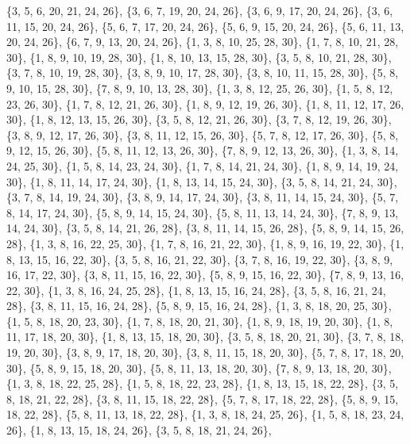 \documentclass[11pt,a4paper]{article}
\begin{document}
{\{3, 5, 6, 20, 21, 24, 26\}, \{3, 6, 7, 19, 20, 24, 26\}, \{3, 6, 9, 17, 20, 24, 26\}, \{3, 6, 11, 15, 20, 24, 26\}, \{5, 6, 7, 17, 20, 24, 26\},
\{5, 6, 9, 15, 20, 24, 26\}, \{5, 6, 11, 13, 20, 24, 26\}, \{6, 7, 9, 13, 20, 24, 26\}, \{1, 3, 8, 10, 25, 28, 30\}, \{1, 7, 8, 10, 21, 28, 30\},
\{1, 8, 9, 10, 19, 28, 30\}, \{1, 8, 10, 13, 15, 28, 30\}, \{3, 5, 8, 10, 21, 28, 30\}, \{3, 7, 8, 10, 19, 28, 30\}, \{3, 8, 9, 10, 17, 28, 30\},
\{3, 8, 10, 11, 15, 28, 30\}, \{5, 8, 9, 10, 15, 28, 30\}, \{7, 8, 9, 10, 13, 28, 30\}, \{1, 3, 8, 12, 25, 26, 30\}, \{1, 5, 8, 12, 23, 26, 30\},
\{1, 7, 8, 12, 21, 26, 30\}, \{1, 8, 9, 12, 19, 26, 30\}, \{1, 8, 11, 12, 17, 26, 30\}, \{1, 8, 12, 13, 15, 26, 30\}, \{3, 5, 8, 12, 21, 26, 30\},
\{3, 7, 8, 12, 19, 26, 30\}, \{3, 8, 9, 12, 17, 26, 30\}, \{3, 8, 11, 12, 15, 26, 30\}, \{5, 7, 8, 12, 17, 26, 30\}, \{5, 8, 9, 12, 15, 26, 30\},
\{5, 8, 11, 12, 13, 26, 30\}, \{7, 8, 9, 12, 13, 26, 30\}, \{1, 3, 8, 14, 24, 25, 30\}, \{1, 5, 8, 14, 23, 24, 30\}, \{1, 7, 8, 14, 21, 24, 30\},
\{1, 8, 9, 14, 19, 24, 30\}, \{1, 8, 11, 14, 17, 24, 30\}, \{1, 8, 13, 14, 15, 24, 30\}, \{3, 5, 8, 14, 21, 24, 30\}, \{3, 7, 8, 14, 19, 24, 30\},
\{3, 8, 9, 14, 17, 24, 30\}, \{3, 8, 11, 14, 15, 24, 30\}, \{5, 7, 8, 14, 17, 24, 30\}, \{5, 8, 9, 14, 15, 24, 30\}, \{5, 8, 11, 13, 14, 24, 30\},
\{7, 8, 9, 13, 14, 24, 30\}, \{3, 5, 8, 14, 21, 26, 28\}, \{3, 8, 11, 14, 15, 26, 28\}, \{5, 8, 9, 14, 15, 26, 28\}, \{1, 3, 8, 16, 22, 25, 30\},
\{1, 7, 8, 16, 21, 22, 30\}, \{1, 8, 9, 16, 19, 22, 30\}, \{1, 8, 13, 15, 16, 22, 30\}, \{3, 5, 8, 16, 21, 22, 30\}, \{3, 7, 8, 16, 19, 22, 30\},
\{3, 8, 9, 16, 17, 22, 30\}, \{3, 8, 11, 15, 16, 22, 30\}, \{5, 8, 9, 15, 16, 22, 30\}, \{7, 8, 9, 13, 16, 22, 30\}, \{1, 3, 8, 16, 24, 25, 28\},
\{1, 8, 13, 15, 16, 24, 28\}, \{3, 5, 8, 16, 21, 24, 28\}, \{3, 8, 11, 15, 16, 24, 28\}, \{5, 8, 9, 15, 16, 24, 28\}, \{1, 3, 8, 18, 20, 25, 30\},
\{1, 5, 8, 18, 20, 23, 30\}, \{1, 7, 8, 18, 20, 21, 30\}, \{1, 8, 9, 18, 19, 20, 30\}, \{1, 8, 11, 17, 18, 20, 30\}, \{1, 8, 13, 15, 18, 20, 30\},
\{3, 5, 8, 18, 20, 21, 30\}, \{3, 7, 8, 18, 19, 20, 30\}, \{3, 8, 9, 17, 18, 20, 30\}, \{3, 8, 11, 15, 18, 20, 30\}, \{5, 7, 8, 17, 18, 20, 30\},
\{5, 8, 9, 15, 18, 20, 30\}, \{5, 8, 11, 13, 18, 20, 30\}, \{7, 8, 9, 13, 18, 20, 30\}, \{1, 3, 8, 18, 22, 25, 28\}, \{1, 5, 8, 18, 22, 23, 28\},
\{1, 8, 13, 15, 18, 22, 28\}, \{3, 5, 8, 18, 21, 22, 28\}, \{3, 8, 11, 15, 18, 22, 28\}, \{5, 7, 8, 17, 18, 22, 28\}, \{5, 8, 9, 15, 18, 22, 28\},
\{5, 8, 11, 13, 18, 22, 28\}, \{1, 3, 8, 18, 24, 25, 26\}, \{1, 5, 8, 18, 23, 24, 26\}, \{1, 8, 13, 15, 18, 24, 26\}, \{3, 5, 8, 18, 21, 24, 26\},
}
\end{document}
